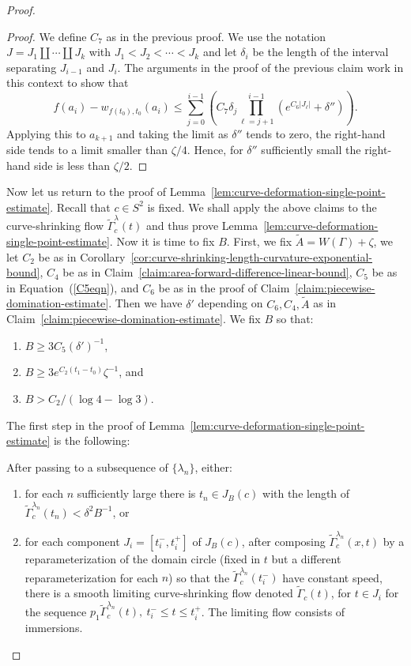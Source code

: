 \begin{proof}
\begin{proof}
We define $C_7$ as in the previous proof. We use the notation
$J=J_1\coprod\cdots\coprod J_k$ with $J_1<J_2<\cdots<J_k$ and let
$\delta_i$ be the length of the interval separating $J_{i-1}$ and
$J_i$. The arguments in the proof of the previous claim work in this
context to show that
$$f(a_i)-w_{f(t_0),t_0}(a_i)\le
\sum_{j=0}^{i-1}\left(C_7\delta_j\prod_{\ell=j+1}^{i-1}(e^{C_6|J_\ell|}+\delta'')\right).$$
Applying this to $a_{k+1}$ and taking the limit as $\delta''$ tends
to zero, the right-hand side tends to a limit smaller than
$\zeta/4$. Hence, for $\delta''$ sufficiently small the right-hand
side is less than $\zeta/2$.
\end{proof}

Now let us return to the proof of Lemma~\ref{lem:curve-deformation-single-point-estimate}. Recall
that $c\in S^2$ is fixed. We shall apply the above claims to the
curve-shrinking flow $\widetilde\Gamma_c^\lambda(t)$ and thus prove
Lemma~\ref{lem:curve-deformation-single-point-estimate}. Now it is time to fix $B$. First, we fix
$\widetilde A=W(\Gamma)+\zeta$,  we let $C_2$ be as in
Corollary~\ref{cor:curve-shrinking-length-curvature-exponential-bound}, $C_4$ be as in Claim~\ref{claim:area-forward-difference-linear-bound},
$C_5$ be as in Equation~(\ref{C5eqn}), and $C_6$ be as in the proof
of Claim~\ref{claim:piecewise-domination-estimate}. Then we have $\delta'$ depending on
$C_6,C_4,\widetilde A$ as in Claim~\ref{claim:piecewise-domination-estimate}. We fix $B$ so
that:
\begin{enumerate}
\item[(1)]  $B\ge 3C_5(\delta')^{-1}$,
\item[(2)] $B\ge 3e^{C_2(t_1-t_0)}\zeta^{-1}$, and
\item[(3)] $B>C_2/(\log 4-\log 3)$.
\end{enumerate}
The first step in the proof of Lemma~\ref{lem:curve-deformation-single-point-estimate} is the
following:

\begin{claim}
\label{claim:curve-shrinking-flow-limit}
\label{limitcs}
After passing to a subsequence of $\{\lambda_n\}$, either:
\begin{enumerate}
\item[(1)] for each $n$ sufficiently large there is $t_n\in J_B(c)$ with
the length of $\widetilde\Gamma_c^{\lambda_n}(t_n)<\delta^2B^{-1}$,
or
\item[(2)] for each component $J_i=[t_i^-,t_i^+]$ of $ J_B(c)$, after
composing $\widetilde\Gamma_c^{\lambda_n}(x,t)$ by a
reparameterization of the domain circle (fixed in $t$ but a
different reparameterization for each $n$) so that the $\widetilde
\Gamma_c^{\lambda_n}(t_i^-)$ have constant speed, there is a smooth
limiting curve-shrinking flow denoted $\widetilde\Gamma_c(t)$, for
$t\in J_i$ for the sequence $p_1\widetilde\Gamma_c^{\lambda_n}(t),\
t_i^-\le t\le t_i^+$. The limiting flow consists of immersions.
\end{enumerate}
\end{claim}


\end{proof}
